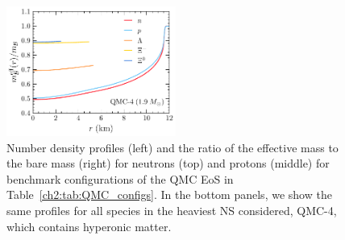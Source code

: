 \begin{figure}[t!bp]
    \includegraphics[width=0.495\textwidth]{meff_B_QMC_profs.pdf}
    \caption[Number density profiles (left) and the ratio of the effective mass to the bare mass (right) for neutrons (top) and protons (middle) for benchmark configurations of the QMC EoS in Table~\ref{ch2:tab:QMC_configs}.]{Number density profiles (left) and the ratio of the effective mass to the bare mass (right) for neutrons (top) and protons (middle) for benchmark configurations of the QMC EoS in Table~\ref{ch2:tab:QMC_configs}. In the bottom panels, we show the same profiles for all species in the heaviest NS considered, QMC-4, which contains hyperonic matter.}
    \label{ch2:fig:QMC_profiles}
\end{figure}
